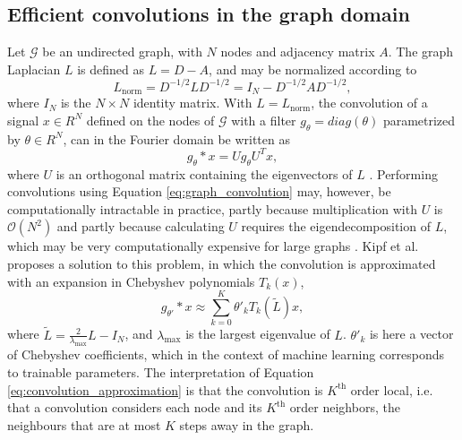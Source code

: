 \subsection{Efficient convolutions in the graph domain}

Let $\mathcal{G}$ be an undirected graph, with $N$ nodes and adjacency matrix $A$. The graph Laplacian $L$ is defined as $L=D-A$, and may be normalized according to
\begin{equation}
    L_\text{norm} = D^{-1/2} L D^{-1/2} =  I_N - D^{-1/2} A D^{-1/2},
    \label{eq:normalized_graph_laplacian}
\end{equation}
where $I_N$ is the $N \times N$ identity matrix. With $L = L_{\text{norm}}$, the convolution of a signal $x \in R^N$ defined on the nodes of $\mathcal{G}$ with a filter $g_\theta = diag(\theta)$ parametrized by $\theta \in R^N$, can in the Fourier domain be written as
\begin{equation}
    g_\theta * x = U g_\theta U^T x,
    \label{eq:graph_convolution}
\end{equation}
where $U$ is an orthogonal matrix containing the eigenvectors of $L$ \cite{kipf_semi_supervised}. Performing convolutions using Equation \eqref{eq:graph_convolution} may, however, be computationally intractable in practice, partly because multiplication with $U$ is $\mathcal{O}(N^2)$ and partly because calculating $U$ requires the eigendecomposition of $L$, which may be very computationally expensive for large graphs \cite{kipf_semi_supervised}. Kipf et al. \cite{kipf_semi_supervised} proposes a solution to this problem, in which the convolution is approximated with an expansion in Chebyshev polynomials $T_k(x)$,
\begin{equation}
    g_{\theta'} * x \approx \sum_{k=0}^K \theta'_k T_k(\tilde{L})x,
    \label{eq:convolution_approximation}
\end{equation}
where $\tilde{L} =  \frac{2}{\lambda_{\text{max}}}L - I_N$, and $\lambda_{\text{max}}$ is the largest eigenvalue of $L$. $\theta'_k$ is here a vector of Chebyshev coefficients, which in the context of machine learning corresponds to trainable parameters. The interpretation of Equation \eqref{eq:convolution_approximation} is that the convolution is $K^{\text{th}}$ order local, i.e. that a convolution considers each node and its $K^{\text{th}}$ order neighbors, the neighbours that are at most $K$ steps away in the graph. 

